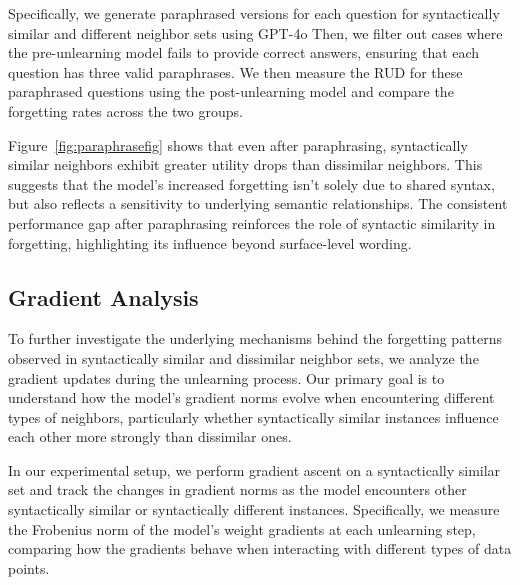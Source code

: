 Specifically, we generate paraphrased versions for each question for syntactically similar and different neighbor sets using GPT-4o Then, we filter out cases where the pre-unlearning model fails to provide correct answers, ensuring that each question has three valid paraphrases. We then measure the RUD for these paraphrased questions using the post-unlearning model and compare the forgetting rates across the two groups.

Figure~\ref{fig:paraphrasefig} shows that even after paraphrasing, syntactically similar neighbors exhibit greater utility drops than dissimilar neighbors. This suggests that the model's increased forgetting isn't solely due to shared syntax, but also reflects a sensitivity to underlying semantic relationships. The consistent performance gap after paraphrasing reinforces the role of syntactic similarity in forgetting, highlighting its influence beyond surface-level wording.







\subsection{Gradient Analysis}
\label{sec:5_4}
To further investigate the underlying mechanisms behind the forgetting patterns observed in syntactically similar and dissimilar neighbor sets, we analyze the gradient updates during the unlearning process. Our primary goal is to understand how the model's gradient norms evolve when encountering different types of neighbors, particularly whether syntactically similar instances influence each other more strongly than dissimilar ones.

In our experimental setup, we perform gradient ascent on a syntactically similar set and track the changes in gradient norms as the model encounters other syntactically similar or syntactically different instances. Specifically, we measure the Frobenius norm of the model’s weight gradients at each unlearning step, comparing how the gradients behave when interacting with different types of data points.


